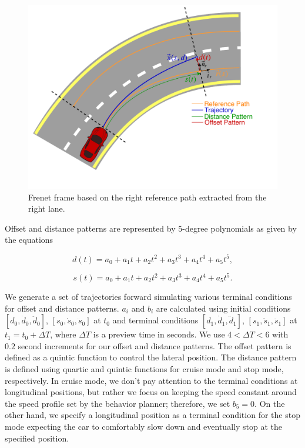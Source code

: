 \begin{figure}[h]
  \centering
  \includegraphics[width=1.0\textwidth]{figures/frenet-frame.pdf}
  \caption[Frenet frame]{Frenet frame based on the right reference path
    extracted from the right lane.}
  \label{figure:frenet}
\end{figure}

Offset and distance patterns are represented by 5-degree polynomials as
given by the equations

\begin{equation}
  d(t) = a_0 + a_1t + a_2t^2 + a_3t^3 + a_4t^4 + a_5t^5,
  \label{eq:dt}
\end{equation}

\begin{equation}
  s(t) = a_0 + a_1t + a_2t^2 + a_3t^3 + a_4t^4 + a_5t^5.
  \label{eq:st}
\end{equation}

We generate a set of trajectories forward simulating various terminal
conditions for offset and distance patterns. $a_i$ and $b_i$ are calculated
using initial conditions $[d_0, \dot{d}_0, \ddot{d}_0]$, $[s_0, \dot{s}_0,
\ddot{s}_0]$ at $t_0$ and terminal conditions $[d_1, \dot{d}_1, \ddot{d}_1]$,
$[s_1, \dot{s}_1, \ddot{s}_1]$ at $t_1 = t_0 + \Delta T$, where $\Delta T$ is a
preview time in seconds. We use $4 < \Delta T < 6$ with $0.2$ second increments
for our offset and distance patterns. The offset pattern is defined as a
quintic function to control the lateral position. The distance pattern is
defined using quartic and quintic functions for cruise mode and stop mode,
respectively. In cruise mode, we don't pay attention to the terminal conditions
at longitudinal positions, but rather we focus on keeping the speed constant
around the speed profile set by the behavior planner; therefore, we set $b_5 =
0$. On the other hand, we specify a longitudinal position as a terminal
condition for the stop mode expecting the car to comfortably slow down and
eventually stop at the specified position.

